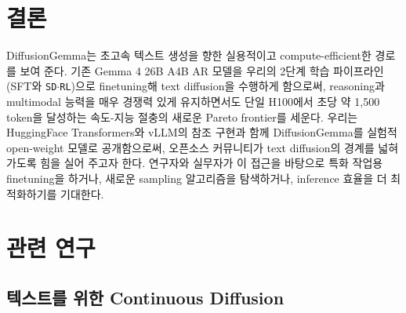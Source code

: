 \documentclass[11pt, a4paper, logo, copyright, gdm]{google}
\newcommand{\sdrl}{\texttt{{\small SD$\cdot$RL}}\xspace}
\begin{document}
\section{결론} \label{sec:conclusion}
DiffusionGemma는 초고속 텍스트 생성을 향한 실용적이고 compute-efficient한 경로를 보여 준다. 기존 Gemma 4 26B A4B AR 모델을 우리의 2단계 학습 파이프라인(SFT와 \sdrl)으로 finetuning해 text diffusion을 수행하게 함으로써, reasoning과 multimodal 능력을 매우 경쟁력 있게 유지하면서도 단일 H100에서 초당 약 1,500 token을 달성하는 속도-지능 절충의 새로운 Pareto frontier를 세운다. 우리는 HuggingFace Transformers와 vLLM의 참조 구현과 함께 DiffusionGemma를 실험적 open-weight 모델로 공개함으로써, 오픈소스 커뮤니티가 text diffusion의 경계를 넓혀 가도록 힘을 실어 주고자 한다. 연구자와 실무자가 이 접근을 바탕으로 특화 작업용 finetuning을 하거나, 새로운 sampling 알고리즘을 탐색하거나, inference 효율을 더 최적화하기를 기대한다.



\newpage

\appendix



\newpage

\section{관련 연구} \label{sec:related_work}

\subsection{텍스트를 위한 Continuous Diffusion}
\end{document}
